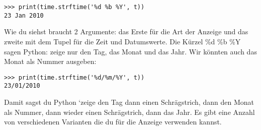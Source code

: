 \begin{Verbatim}[frame=single]
>>> print(time.strftime('%d %b %Y', t))
23 Jan 2010
\end{Verbatim}

Wie du siehst braucht  2 Argumente: das Erste für die Art der Anzeige und das zweite mit dem Tupel für die Zeit und Datumswerte. Die Kürzel \%d \%b \%Y  sagen Python: zeige nur den Tag, das Monat und das Jahr. Wir könnten auch das Monat als Nummer ausgeben:

\begin{Verbatim}[frame=single]
>>> print(time.strftime('%d/%m/%Y', t))
23/01/2010
\end{Verbatim}

Damit sagst du Python `zeige den Tag dann einen Schrägstrich, dann den Monat als Nummer, dann wieder einen Schrägstrich, dann das Jahr. Es gibt eine Anzahl von verschiedenen Varianten die du für die Anzeige verwenden kannst.

